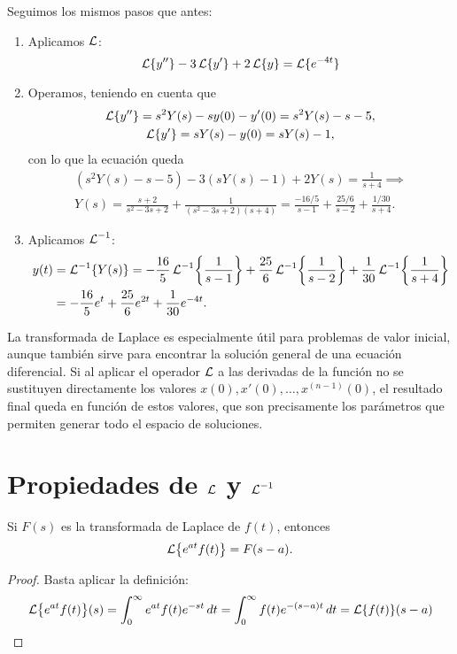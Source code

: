 \documentclass[../ecuaciones_diferenciales.tex]{subfiles}
\begin{document}
\begin{solution}
	Seguimos los mismos pasos que antes:
	\begin{enumerate}[1)]
		\item Aplicamos \(\operatorname{\mathcal{L}}\):
		      \[\operatorname{\mathcal{L}}\{y''\} - 3\operatorname{\mathcal{L}}\{y'\} + 2\operatorname{\mathcal{L}}\{y\} = \operatorname{\mathcal{L}}\{e^{-4t}\}\]
		\item Operamos, teniendo en cuenta que
		      \begin{gather*}
			      \operatorname{\mathcal{L}}\{y''\} = s^2Y(s) - sy(0) - y'(0) = s^2Y(s) - s - 5, \\
			      \operatorname{\mathcal{L}}\{y'\} = sY(s) - y(0) = sY(s) - 1,
		      \end{gather*}
		      con lo que la ecuación queda
		      \begin{gather*}
			      \left(s^2Y(s) - s - 5\right) - 3\left(sY(s) - 1\right) + 2Y(s) =
			      \frac{1}{s+4} \implies \\
			      Y(s) = \frac{s+2}{s^2-3s+2} + \frac{1}{(s^2-3s+2)(s+4)} =
			      \frac{-16/5}{s-1} + \frac{25/6}{s-2} + \frac{1/30}{s+4}.
		      \end{gather*}
		\item Aplicamos \(\operatorname{\mathcal{L}}^{-1}\):
		      \begin{align*}
			      y(t) & = \laplace^{-1}\{Y(s)\}
			      = -\frac{16}{5}\laplace^{-1}\left\{\frac{1}{s-1}\right\}
			      + \frac{25}{6}\laplace^{-1}\left\{\frac{1}{s-2}\right\}
			      + \frac{1}{30}\laplace^{-1}\left\{\frac{1}{s+4}\right\} \\
			           & = -\frac{16}{5}e^t + \frac{25}{6}e^{2t}
			      + \frac{1}{30}e^{-4t}.
		      \end{align*}
	\end{enumerate}
\end{solution}

\begin{remark}
	La transformada de Laplace es especialmente útil para problemas de valor
	inicial, aunque también sirve para encontrar la solución general de una
	ecuación diferencial. Si al aplicar el operador \(\operatorname{\mathcal{L}}\) a las derivadas de la
	función no se sustituyen directamente los valores
	\(x(0), x'(0), \dots, x^{(n-1)}(0)\), el resultado final queda en función de
	estos valores, que son precisamente los parámetros que permiten generar todo
	el espacio de soluciones.
\end{remark}

\section{Propiedades de \(\operatorname{\mathcal{L}}\) y \(\operatorname{\mathcal{L}}^{-1}\)}
\begin{proposition}
	Si \(F(s)\) es la transformada de Laplace de \(f(t)\), entonces
	\[\laplace\left\{e^{at}f(t)\right\} = F(s-a).\]
	\begin{proof}
		Basta aplicar la definición:
		\[\laplace\left\{e^{at}f(t)\right\}(s) = \int_0^\infty e^{at}f(t) e^{-st} \dif t
			= \int_0^\infty f(t) e^{-(s-a)t} \dif t = \laplace\{f(t)\}(s-a)\]
	\end{proof}
\end{proposition}
\end{document}
